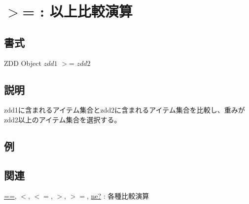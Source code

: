 
\section{$>$= : 以上比較演算\label{sect:ge}}
\subsection*{書式}
ZDD Object  $zdd1$ $>$= $zdd2$

\subsection*{説明}
zdd1に含まれるアイテム集合とzdd2に含まれるアイテム集合を比較し、重みがzdd2以上のアイテム集合を選択する。

\subsection*{例}


\subsection*{関連}
\hyperref[sect:eq]{==},
\hyperref[sect:lt]{$<$},
\hyperref[sect:le]{$<=$},
\hyperref[sect:gt]{$>$},
\hyperref[sect:ge]{$>=$},
\hyperref[sect:ne]{ne?} : 各種比較演算
